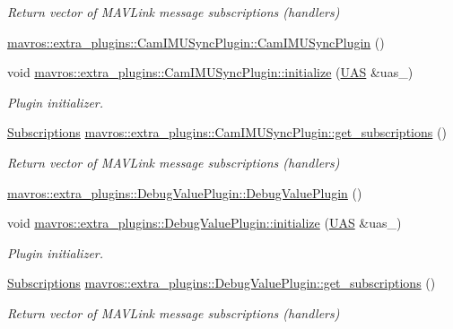 \begin{DoxyCompactItemize}
\begin{DoxyCompactList}\small\item\em Return vector of M\+A\+V\+Link message subscriptions (handlers) \end{DoxyCompactList}\item 
\mbox{\hyperlink{group__plugin_gad8c0b7cdde6942c12add29c49e0c3067}{mavros\+::extra\+\_\+plugins\+::\+Cam\+I\+M\+U\+Sync\+Plugin\+::\+Cam\+I\+M\+U\+Sync\+Plugin}} ()
\item 
void \mbox{\hyperlink{group__plugin_ga6f1ea337208a0cc239f23025209b8be8}{mavros\+::extra\+\_\+plugins\+::\+Cam\+I\+M\+U\+Sync\+Plugin\+::initialize}} (\mbox{\hyperlink{classmavros_1_1UAS}{U\+AS}} \&uas\+\_\+)
\begin{DoxyCompactList}\small\item\em Plugin initializer. \end{DoxyCompactList}\item 
\mbox{\hyperlink{group__plugin_ga8967d61fc77040e0c3ea5a4585d62a09}{Subscriptions}} \mbox{\hyperlink{group__plugin_gad1579267289ff44ce0ddcb795e480663}{mavros\+::extra\+\_\+plugins\+::\+Cam\+I\+M\+U\+Sync\+Plugin\+::get\+\_\+subscriptions}} ()
\begin{DoxyCompactList}\small\item\em Return vector of M\+A\+V\+Link message subscriptions (handlers) \end{DoxyCompactList}\item 
\mbox{\hyperlink{group__plugin_gaad8fc784bbe6fddeae69c2347b40bdc8}{mavros\+::extra\+\_\+plugins\+::\+Debug\+Value\+Plugin\+::\+Debug\+Value\+Plugin}} ()
\item 
void \mbox{\hyperlink{group__plugin_ga2f1235653fca1e9789a8e0842db27743}{mavros\+::extra\+\_\+plugins\+::\+Debug\+Value\+Plugin\+::initialize}} (\mbox{\hyperlink{classmavros_1_1UAS}{U\+AS}} \&uas\+\_\+)
\begin{DoxyCompactList}\small\item\em Plugin initializer. \end{DoxyCompactList}\item 
\mbox{\hyperlink{group__plugin_ga8967d61fc77040e0c3ea5a4585d62a09}{Subscriptions}} \mbox{\hyperlink{group__plugin_ga9ae270242b82f1aebfcccc109c008be1}{mavros\+::extra\+\_\+plugins\+::\+Debug\+Value\+Plugin\+::get\+\_\+subscriptions}} ()
\begin{DoxyCompactList}\small\item\em Return vector of M\+A\+V\+Link message subscriptions (handlers) \end{DoxyCompactList}\item 

\end{DoxyCompactItemize}
